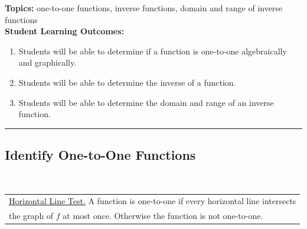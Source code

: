 

\noindent \textbf{Topics:}  one-to-one functions, inverse functions, domain and range of inverse functions\\

\noindent \textbf{Student Learning Outcomes:}
\begin{enumerate}
\item Students will be able to determine if a function is one-to-one algebraically and graphically.
\item Students will be able to determine the inverse of a function.
\item Students will be able to determine the domain and range of an inverse function.
\end{enumerate}

\hrule 

\bigskip

\subsection{Identify One-to-One Functions} ~


\noindent \begin{tabular}{ | l  |} \hline
\noindent \underline{Horizontal Line Test.} A function is one-to-one if every horizontal line intersects \\ the graph of $f$ at most once. Otherwise the function is not one-to-one. \\  \hline
\end{tabular} 

